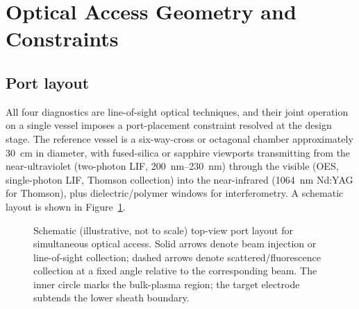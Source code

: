 \section{Optical Access Geometry and Constraints}

\subsection{Port layout}

All four diagnostics are line-of-sight optical techniques, and their joint operation on a single vessel imposes a port-placement constraint resolved at the design stage. The reference vessel is a six-way-cross or octagonal chamber approximately \SI{30}{\centi\meter} in diameter, with fused-silica or sapphire viewports transmitting from the near-ultraviolet (two-photon LIF, \SIrange{200}{230}{\nano\meter}) through the visible (OES, single-photon LIF, Thomson collection) into the near-infrared (\SI{1064}{\nano\meter} Nd:YAG for Thomson), plus dielectric/polymer windows for interferometry. A schematic layout is shown in Figure~\ref{fig:ports}.

\begin{figure}[htbp]
\centering
{}
\caption{Schematic (illustrative, not to scale) top-view port layout for simultaneous optical access. Solid arrows denote beam injection or line-of-sight collection; dashed arrows denote scattered/fluorescence collection at a fixed angle relative to the corresponding beam. The inner circle marks the bulk-plasma region; the target electrode subtends the lower sheath boundary.}
\label{fig:ports}
\end{figure}

